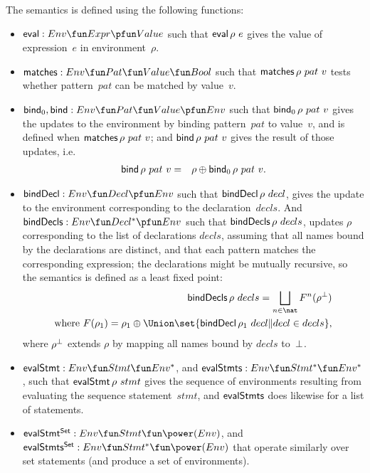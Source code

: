The semantics is defined using the following functions:
%
\begin{itemize}
\item $\eval : Env \fun Expr \pfun Value$ such that $\mathop{\sf eval} \rho~e$ gives the
  value of expression~$e$ in environment~$\rho$.

\item $\matches : Env \fun Pat \fun Value \fun Bool$ such that
  $\mathop{\sf matches} \rho~pat ~ v$ tests whether pattern~$pat$ can be matched by
  value~$v$.

\item $\bind_0, \bind : Env \fun Pat \fun Value \pfun Env$ such that
  $\mathop{\sf bind}\nolimits_0 \rho~pat~v$ gives the updates to the environment by binding
  pattern~$pat$ to value~$v$, and is defined when $\mathop{\sf matches} \rho~ pat~v$; and 
  $\mathop{\sf bind}\nolimits \rho~pat~v$ gives the result of those updates, i.e.
  \begin{eqnarray*}
  \mathop{\sf bind}\nolimits \rho~pat~v & = & \rho \oplus \mathop{\sf bind}\nolimits_0 \rho~pat~v.
  \end{eqnarray*}

\item $\bindDecl : Env \fun Decl \pfun Env$ such that $\mathop{\sf bindDecl} \rho~decl$,
  gives the update to the environment corresponding to the
  declaration~$decls$.  And $\bindDecls : Env \fun Decl^* \pfun Env$ such that
  $\mathop{\sf bindDecls} \rho~decls$, updates $\rho$ corresponding to the list of
  declarations $decls$, assuming that all names bound by the declarations are
  distinct, and that each pattern matches the corresponding expression; the
  declarations might be mutually recursive, so the semantics is defined as a
  least fixed point:
  \[
  \begin{align}
  \bindDecls \rho~decls = \bigsqcup_{n \in \nat} F^n(\rho^\bottom) \\
  \mbox{where } F(\rho_1)  =  
    \rho_1 \oplus \Union \set{\bindDecl \rho_1 ~ decl \| decl \in decls},
  \end{align}
  \]
  where $\rho^\perp$ extends $\rho$ by mapping all names bound by $decls$
  to~$\perp$. 

\item $\evalStmt: Env \fun Stmt \fun Env^*$, and $\evalStmts : Env \fun Stmt^*
  \fun Env^*$, such that $\mathop{\sf evalStmt} \rho~stmt$ gives the sequence of
  environments resulting from evaluating the sequence statement~$stmt$, and
  $\mathop{\sf evalStmts}$ does likewise for a list of statements.

\item $\evalStmtSet : Env \fun Stmt \fun \power(Env)$, and $\evalStmtsSet :
  Env \fun Stmt^* \fun \power(Env)$ that operate similarly over set statements
  (and produce a set of environments).
\end{itemize}

